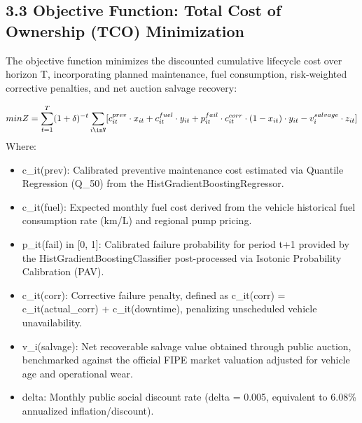 \documentclass[10pt,a4paper,journal]{article}
\begin{document}
\subsection{3.3 Objective Function: Total Cost of Ownership (TCO) Minimization}
The objective function minimizes the discounted cumulative lifecycle cost over horizon T, incorporating planned maintenance, fuel consumption, risk-weighted corrective penalties, and net auction salvage recovery:

\begin{equation}
min Z = \sum_{t=1}^{T} (1 + \delta)^{-t} \sum_{i\inV} [ c_{it}^{prev} \cdot x_{it} + c_{it}^{fuel} \cdot y_{it} + p_{it}^{fail} \cdot c_{it}^{corr} \cdot (1 - x_{it}) \cdot y_{it} - v_{i}^{salvage} \cdot z_{it} ] \label{eq:4}
\end{equation}
Where:

\begin{itemize}
\item c\_it(prev): Calibrated preventive maintenance cost estimated via Quantile Regression (Q\_50) from the HistGradientBoostingRegressor.
\end{itemize}
\begin{itemize}
\item c\_it(fuel): Expected monthly fuel cost derived from the vehicle historical fuel consumption rate (km/L) and regional pump pricing.
\end{itemize}
\begin{itemize}
\item p\_it(fail) in [0, 1]: Calibrated failure probability for period t+1 provided by the HistGradientBoostingClassifier post-processed via Isotonic Probability Calibration (PAV).
\end{itemize}
\begin{itemize}
\item c\_it(corr): Corrective failure penalty, defined as c\_it(corr) = c\_it(actual\_corr) + c\_it(downtime), penalizing unscheduled vehicle unavailability.
\end{itemize}
\begin{itemize}
\item v\_i(salvage): Net recoverable salvage value obtained through public auction, benchmarked against the official FIPE market valuation adjusted for vehicle age and operational wear.
\end{itemize}
\begin{itemize}
\item delta: Monthly public social discount rate (delta = 0.005, equivalent to 6.08\% annualized inflation/discount).
\end{itemize}
\end{document}
